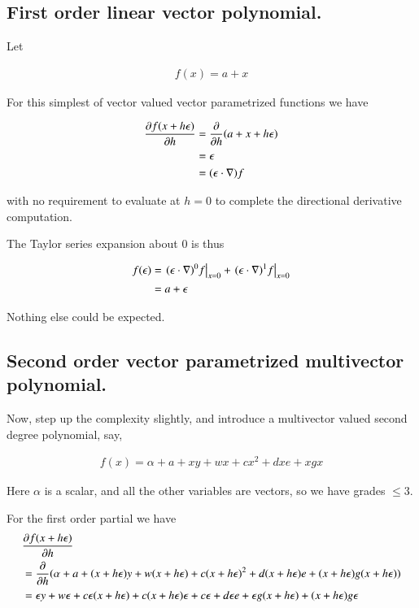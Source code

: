 \subsection{First order linear vector polynomial. }

Let

\begin{align*}
f(x) = a + x
\end{align*}

For this simplest of vector valued vector parametrized functions we have

\begin{align*}
\PD{h}{f(x + h \epsilon)} 
&= \PD{h}{} (a + x + h \epsilon) \\
&= \epsilon \\
&= (\epsilon \cdot \grad) f
\end{align*}

with no requirement to evaluate at $h=0$ to complete the directional derivative computation.

The Taylor series expansion about $0$ is thus

\begin{align*}
f(\epsilon) 
&= \left. (\epsilon \cdot \grad)^0 f \right\vert_{x=0} + \left. (\epsilon \cdot \grad)^1 f  \right\vert_{x=0} \\
&= a + \epsilon \\
\end{align*}

Nothing else could be expected.

\subsection{Second order vector parametrized multivector polynomial. }

Now, step up the complexity slightly, and introduce a multivector valued second degree polynomial, say,

\begin{align}\label{eqn:multivector_taylors:secondOrder}
f(x) = \alpha + a + x y + w x + c x^2 + d x e + x g x
\end{align}

Here $\alpha$ is a scalar, and all the other variables are vectors, so we have grades $\le 3$.

For the first order partial we have
\begin{align*}
&\PD{h}{f(x + h \epsilon)} \\
&= \PD{h}{} ( \alpha + a + (x + h\epsilon) y + w (x + h\epsilon) + c (x + h\epsilon)^2 + d (x + h\epsilon) e + (x + h\epsilon) g (x + h\epsilon) ) \\
&= 
\epsilon y 
+ w \epsilon
+ c \epsilon (x + h\epsilon) 
+ c (x + h\epsilon) \epsilon
+ c \epsilon 
+ d \epsilon e 
+ \epsilon g (x + h\epsilon) 
+ (x + h\epsilon) g \epsilon \\
\end{align*}

